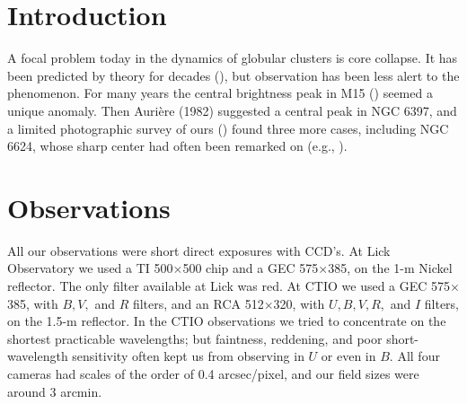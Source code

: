 

%

\section{Introduction}

A focal problem today in the dynamics of globular clusters is 
core collapse.  It has been predicted by theory
for decades (\cite{hen61,lyn68,spi85}), but
observation has been less alert to the phenomenon. For many years the 
central brightness peak in M15 (\cite{kin75,new78})
seemed a unique anomaly.  Then Auri\`ere (1982) suggested a central peak 
in NGC 6397, and a limited photographic survey of ours (\cite[Paper I]{djo84})
found three more cases, including NGC 6624, whose
sharp center had often been remarked on (e.g., \cite{can78}).

\section{Observations}

All our observations were short direct exposures with CCD's.  At
Lick Observatory we used a TI 500$\times$500 chip 
and a GEC 575$\times$385, on the 1-m Nickel reflector.  The only
filter available at Lick was red.  At CTIO we used a GEC 575$\times$385, with
$B, V,$ and $R$ filters, and an RCA 512$\times$320, with $U, B, V, R,$ and $I$
filters, on the 1.5-m reflector. In the CTIO observations we tried to
concentrate on the shortest practicable wavelengths; but faintness, reddening,
and poor short-wavelength sensitivity often kept us from observing in $U$ or
even in $B$. All four cameras had scales of the order of 0.4 arcsec/pixel, and
our field sizes were around 3 arcmin. 

